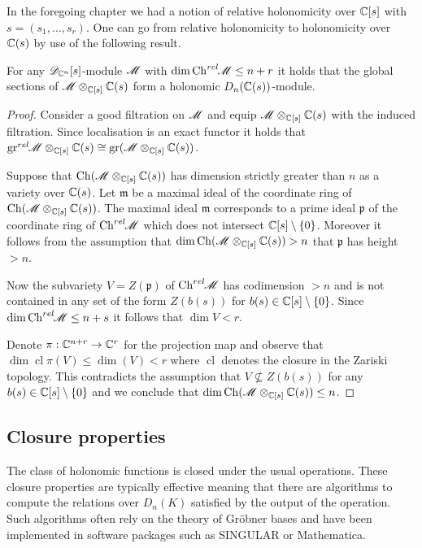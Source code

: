 In the foregoing chapter we had a notion of relative holonomicity over $\mathbb{C}[s]$ with $s = (s_1,\ldots,s_r)$.
One can go from relative holonomicity to holonomicity over $\mathbb{C}(s)$ by use of the following result.
\begin{lemma}
    For any $\mathscr{D}_{\mathbb{C}^n}[s]$-module $\mathscr{M}$ with $\dim\operatorname{Ch}^{rel}\mkern-5mu\mathscr{M}\leq n+r$ it holds that the global sections of $\mathscr{M}\otimes_{\mathbb{C}[s]}\mathbb{C}(s)$ form a holonomic $D_n(\mathbb{C}(s))$-module.
\end{lemma}
  \begin{proof}
    Consider a good filtration on $\mathscr{M}$ and equip $\mathscr{M}\otimes_{\mathbb{C}[s]}\mathbb{C}(s)$ with the induced filtration.
    Since localisation is an exact functor it holds that $\operatorname{gr}^{rel}\mkern-5mu\mathscr{M}\otimes_{\mathbb{C}[s]}\mathbb{C}(s) \cong \operatorname{gr}(\mathscr{M}\otimes_{\mathbb{C}[s]}\mathbb{C}(s)) $.

    Suppose that $\operatorname{Ch}(\mathscr{M}\otimes_{\mathbb{C}[s]}\mathbb{C}(s))$ has dimension strictly greater than $n$ as a variety over $\mathbb{C}(s)$.
    Let $\mathfrak{m}$ be a maximal ideal of the coordinate ring of $\operatorname{Ch} (\mathscr{M}\otimes_{\mathbb{C}[s]}\mathbb{C}(s))$.
    The maximal ideal $\mathfrak{m}$ corresponds to a prime ideal $\mathfrak{p}$ of the coordinate ring of $\operatorname{Ch}^{rel}\mkern-5mu\mathscr{M}$ which does not intersect $\mathbb{C}[s]\setminus\{0\}$.
    Moreover it follows from the assumption that  $\dim\operatorname{Ch}(\mathscr{M}\otimes_{\mathbb{C}[s]}\mathbb{C}(s))> n$ that $\mathfrak{p}$ has height $>n$.

    Now the subvariety $V = Z(\mathfrak{p})$ of $\operatorname{Ch}^{rel}\mkern-5mu\mathscr{M}$ has codimension $>n$ and is not contained in any set of the form $Z(b(s))$ for $b(s)\in \mathbb{C}[s]\setminus\{0\}$.
    Since $\dim\operatorname{Ch}^{rel}\mkern-5mu\mathscr{M}\leq n+s$ it follows that $\dim V <r$.

    Denote $\pi:\mathbb{C}^{n+r}\to\mathbb{C}^r $ for the projection map and observe that $\dim\operatorname{cl}\pi(V)\leq \dim(V) < r$ where $\operatorname{cl}$ denotes the closure in the Zariski topology. %
    This contradicts the assumption that $V\nsubseteq Z(b(s))$ for any $b(s)\in \mathbb{C}[s]\setminus\{0\}$ and we conclude that $\dim \operatorname{Ch} (\mathscr{M}\otimes_{\mathbb{C}[s]}\mathbb{C}(s)) \leq n$.
    \end{proof}
    \subsection{Closure properties}
    The class of holonomic functions is closed under the usual operations.
    These closure properties are typically effective meaning that there are algorithms to compute the relations over $D_n(K)$ satisfied by the output of the operation.
    Such algorithms often rely on the theory of Gr\"obner bases and have been implemented in software packages such as SINGULAR or Mathematica.


